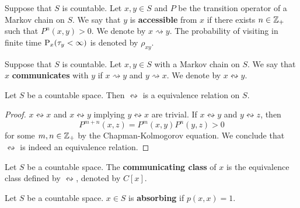 \begin{definition}
    Suppose that $S$ is countable. Let $x,y\in S$ and $P$ be the transition 
    operator of a Markov chain on $S$. We say that $y$ is \textbf{accessible} from $x$ 
    if there exists $n\in\Z_+$ such that $P^{n}(x,y) > 0$. We denote by 
    $x\rightsquigarrow y$. The probability of visiting in finite time 
    $\P_x(\tau_y<\infty)$ is denoted by $\rho_{xy}$. 
\end{definition}

\begin{definition}
    Suppose that $S$ is countable. Let $x,y\in S$ with a Markov chain on $S$. We say that $x$ 
    \textbf{communicates} with $y$ if $x\rightsquigarrow y$ and $y\rightsquigarrow x$. We 
    denote by $x\leftrightsquigarrow y$. 
\end{definition}

\begin{proposition}
    Let $S$ be a countable space. Then $\leftrightsquigarrow$ is a equivalence 
    relation on $S$. 
\end{proposition}
\begin{proof}
    $x\leftrightsquigarrow x$ and $x\leftrightsquigarrow y$ implying $y\leftrightsquigarrow x$ 
    are trivial. If $x\leftrightsquigarrow y$ and $y\leftrightsquigarrow z$, 
    then 
    \begin{equation*}
        P^{m+n}(x,z) = P^m(x,y)P^n(y,z) > 0
    \end{equation*}
    for some $m,n\in\Z_+$ by the Chapman-Kolmogorov equation. We conclude that 
    $\leftrightsquigarrow$ is indeed an equivalence relation. 
\end{proof}

\begin{definition}
    Let $S$ be a countable space. The \textbf{communicating class} of $x$ is the 
    equivalence class defined by $\leftrightsquigarrow$, denoted by $C[x]$. 
\end{definition}

\begin{definition}
    Let $S$ be a countable space. $x\in S$ is \textbf{absorbing} if $p(x, x) = 1$. 
\end{definition}

